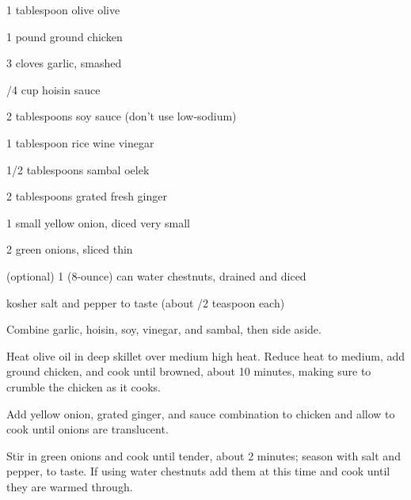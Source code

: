 \begin{IngredientsAndSteps}
    \ListIngredientsAndSteps
    {
        1 tablespoon olive olive

        1 pound ground chicken

        3 cloves garlic, smashed

        /4 cup hoisin sauce

        2 tablespoons soy sauce (don't use low-sodium)

        1 tablespoon rice wine vinegar

        1/2 tablespoons sambal oelek

        2 tablespoons grated fresh ginger

        1 small yellow onion, diced very small

        2 green onions, sliced thin

        (optional) 1 (8-ounce) can water chestnuts, drained and diced

        kosher salt and pepper to taste (about /2 teaspoon each)
    }
    {
        Combine garlic, hoisin, soy, vinegar, and sambal, then side aside.

        Heat olive oil in deep skillet over medium high heat. Reduce heat to medium, add ground chicken,
        and cook until browned, about 10 minutes, making sure to crumble the chicken as it cooks.

        Add yellow onion, grated ginger, and sauce combination to chicken and allow to cook until
        onions are translucent.

        Stir in green onions and cook until tender, about 2 minutes; season with salt
        and pepper, to taste. If using water chestnuts add them at this time and cook
        until they are warmed through.
    }
\end{IngredientsAndSteps}

%
%
%
%
\newpage



